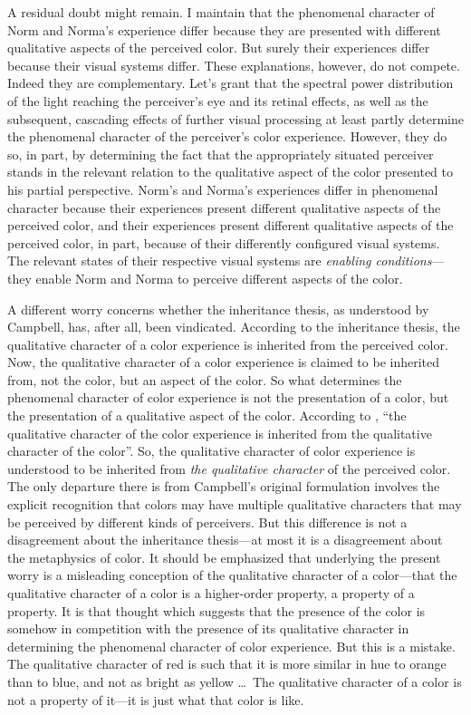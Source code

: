 \documentclass[12pt]{article}
\begin{document}
A residual doubt might remain. I maintain that the phenomenal character of Norm and Norma's experience differ because they are presented with different qualitative aspects of the perceived color. But surely their experiences differ because their visual systems differ. These explanations, however, do not compete. Indeed they are complementary. Let's grant that the spectral power distribution of the light reaching the perceiver's eye and its retinal effects, as well as the subsequent, cascading effects of further visual processing at least partly determine the phenomenal character of the perceiver's color experience. However, they do so, in part, by determining the fact that the appropriately situated perceiver stands in the relevant relation to the qualitative aspect of the color presented to his partial perspective. Norm's and Norma's experiences differ in phenomenal character because their experiences present different qualitative aspects of the perceived color, and their experiences present different qualitative aspects of the perceived color, in part, because of their differently configured visual systems. The relevant states of their respective visual systems are \emph{enabling conditions}---they enable Norm and Norma to perceive different aspects of the color.

A different worry concerns whether the inheritance thesis, as understood by Campbell, has, after all, been vindicated. According to the inheritance thesis, the qualitative character of a color experience is inherited from the perceived color. Now, the qualitative character of a color experience is claimed to be inherited from, not the color, but an aspect of the color. So what determines the phenomenal character of color experience is not the presentation of a color, but the presentation of a qualitative aspect of the color. According to \citet[189]{Campbell:1997dq}, ``the qualitative character of the color experience is inherited from the qualitative character of the color''. So, the qualitative character of color experience is understood to be inherited from \emph{the qualitative character} of the perceived color. The only departure there is from Campbell's original formulation involves the explicit recognition that colors may have multiple qualitative characters that may be perceived by different kinds of perceivers. But this difference is not a disagreement about the inheritance thesis---at most it is a disagreement about the metaphysics of color. It should be emphasized that underlying the present worry is a misleading conception of the qualitative character of a color---that the qualitative character of a color is a higher-order property, a property of a property. It is that thought which suggests that the presence of the color is somehow in competition with the presence of its qualitative character in determining the phenomenal character of color experience. But this is a mistake. The qualitative character of red is such that it is more similar in hue to orange than to blue, and not as bright as yellow \ldots\ The qualitative character of a color is not a property of it---it is just what that color is like. 
\end{document}
